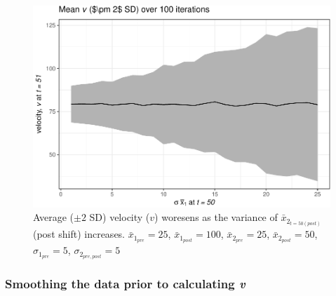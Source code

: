 \documentclass[12pt,twoside,openany]{reedthesis}
\begin{document}
\begin{figure}
\centering
\includegraphics{_myDissertation_files/figure-latex/simVarPlot2-1.pdf}
\caption{\label{fig:simVarPlot2}Average (\(\pm 2\) SD) velocity (\(v\)) woresens as the variance of \(\bar{x}_{2_{t=50 (post)}}\) (post shift) increases. \(\bar{x}_{1_{pre}} = 25\), \(\bar{x}_{1_{post}} = 100\), \(\bar{x}_{2_{pre}} = 25\), \(\bar{x}_{2_{post}} = 50\), \(\sigma_{1_{pre}} = 5\), \(\sigma_{2_{pre,post}} = 5\)}
\end{figure}
\hypertarget{smoothing-the-data-prior-to-calculating-v}{%
\subsubsection{\texorpdfstring{Smoothing the data prior to calculating \emph{v}}{Smoothing the data prior to calculating v}}\label{smoothing-the-data-prior-to-calculating-v}}
\end{document}
